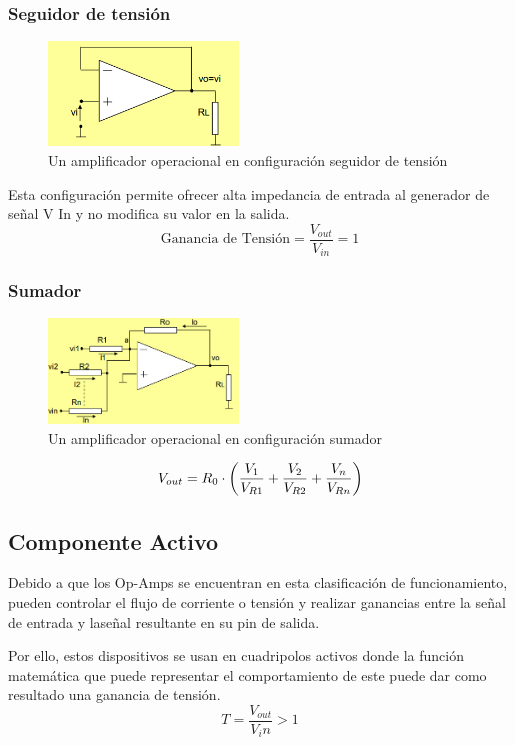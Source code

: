 \documentclass[../main.tex]{subfiles}
\begin{document}
		\subsubsection{Seguidor de tensión}
		\begin{figure}[H]
			\centering
			\includegraphics[width=0.45\textwidth]{imagen5.png}
			\caption{Un amplificador operacional en configuración seguidor de tensión}
		\end{figure}
		Esta configuración permite ofrecer alta impedancia de entrada al generador de
		señal V In y no modifica su valor en la salida.
		\[
		\text{Ganancia de Tensión} = \dfrac{V_{out}}{V_{in}} = 1
		\]
		\subsubsection{Sumador}
		\begin{figure}[H]
			\centering
			\includegraphics[width=0.45\textwidth]{imagen6.png}
			\caption{Un amplificador operacional en configuración sumador} 
		\end{figure}
		\[
			V_{out} = R_0 \cdot 
			\left(
				\dfrac{V_1}{V_{R1}} + \dfrac{V_2}{V_{R2}} + \dfrac{V_n}{V_{Rn}} 
			\right)
		\]

	\clearpage
	\subsection{Componente Activo}
	Debido a que los Op-Amps se encuentran en esta clasificación de funcionamiento, pueden
	controlar el flujo de corriente o tensión y realizar ganancias entre la señal de
	entrada y laseñal resultante en su pin de salida.

	Por ello, estos dispositivos se usan en cuadripolos activos donde la función matemática
	que puede representar el comportamiento de este puede dar como resultado una ganancia
	de tensión.
	\[
		T=\dfrac{V_{out}}{V_in} > 1
	\]
\end{document}
